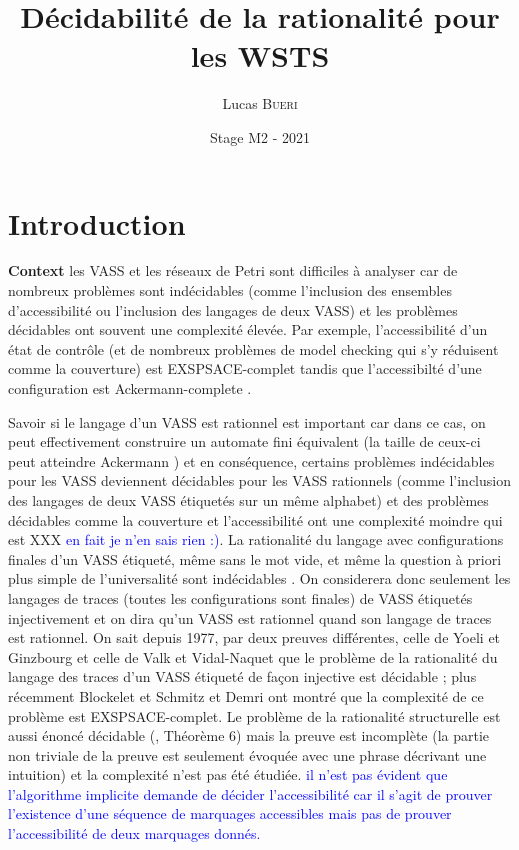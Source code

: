 \documentclass[a4paper,final]{article}
\title{Décidabilité de la rationalité pour les WSTS}
\author{Lucas \textsc{Bueri}}
\date{Stage M2 - 2021}
\theoremstyle{definition}
\newcommand{\alain}[1]{\textcolor{blue}{#1}}
\begin{document}
\maketitle


\section{Introduction}

{\bf Context} les VASS et les  réseaux de Petri sont difficiles à analyser car de nombreux problèmes sont indécidables (comme l'inclusion des ensembles d'accessibilité ou l'inclusion des langages de deux VASS) et les problèmes décidables ont souvent une complexité élevée. Par exemple, l'accessibilité d'un état de contrôle (et de nombreux problèmes de model checking qui s'y réduisent comme la couverture) est EXSPSACE-complet tandis que l'accessibilté d'une configuration est Ackermann-complete \cite{DBLP:journals/corr/abs-2104-12695,DBLP:journals/corr/abs-2105-08551}. 

Savoir si le langage d'un VASS est rationnel est important car dans ce cas, on peut effectivement construire un automate fini équivalent (la taille de ceux-ci peut atteindre Ackermann \cite{vavn81}) et en conséquence, certains problèmes indécidables pour les VASS deviennent décidables pour les VASS rationnels (comme l'inclusion des langages de deux VASS étiquetés sur un même alphabet) et des problèmes décidables comme la couverture et l'accessibilité ont une complexité moindre qui est XXX \alain{en fait je n'en sais rien :)}. La rationalité du langage avec configurations finales d'un VASS étiqueté, même sans le mot vide, et même la question à priori plus simple de l'universalité sont indécidables \cite{giyo80}. On considerera donc seulement les langages de traces (toutes les configurations sont finales) de VASS étiquetés injectivement et on dira qu'un VASS est rationnel quand son langage de traces est rationnel. On sait depuis 1977, par deux preuves différentes, celle de Yoeli et Ginzbourg  \cite{giyo80} et celle de Valk et Vidal-Naquet \cite{DBLP:conf/tcs/ValkV77,giyo80} que le problème de la rationalité du langage des traces d'un VASS étiqueté de façon injective est décidable \cite{giyo80,vavn81}; plus récemment Blockelet et Schmitz \cite{DBLP:conf/mfcs/BlockeletS11} et Demri \cite{DBLP:journals/jcss/Demri13} ont montré que la complexité de ce problème est EXSPSACE-complet. 
Le problème de la rationalité structurelle est aussi énoncé décidable (\cite{vavn81}, Théorème 6) mais la preuve est incomplète (la partie non triviale de la preuve est seulement évoquée avec une phrase décrivant une intuition) et la complexité n'est pas été étudiée.
\alain{	il n'est pas évident que l'algorithme implicite demande de décider l'accessibilité car il s'agit de prouver l'existence d'une séquence de marquages accessibles mais pas de prouver l'accessibilité de deux marquages donnés.} 
\end{document}
